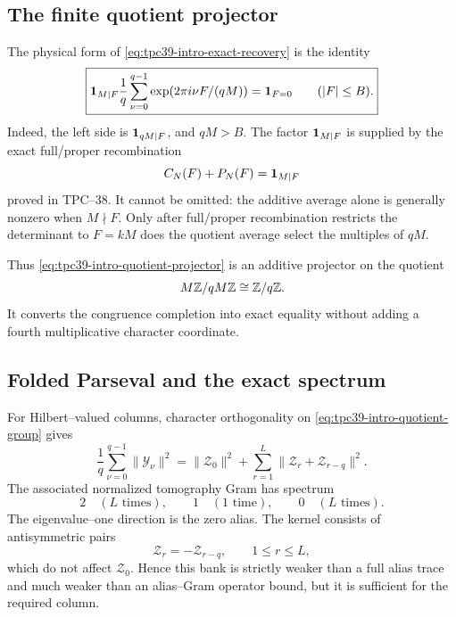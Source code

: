 \subsection{The finite quotient projector}

The physical form of \eqref{eq:tpc39-intro-exact-recovery} is the identity
\begin{equation}
 \boxed{
 \mathbf 1_{M\mid F}\frac1q\sum_{\nu=0}^{q-1}
 \exp(2\pi i \nu F/(qM))
 =\mathbf 1_{F=0}
 \qquad(|F|\le B).}
 \label{eq:tpc39-intro-quotient-projector}
\end{equation}
Indeed, the left side is \(\mathbf 1_{qM\mid F}\), and
\(qM>B\).  The factor \(\mathbf 1_{M\mid F}\) is supplied by the exact
full/proper recombination
\begin{equation}
 C_N(F)+P_N(F)=\mathbf 1_{M\mid F}
 \label{eq:tpc39-intro-face-recombination}
\end{equation}
proved in TPC--38.  It cannot be omitted: the additive average alone
is generally nonzero when \(M\nmid F\).  Only after full/proper
recombination restricts the determinant to \(F=kM\) does the quotient
average select the multiples of \(qM\).

Thus \eqref{eq:tpc39-intro-quotient-projector} is an additive projector on
the quotient
\begin{equation}
 M\mathbb Z/qM\mathbb Z\cong\mathbb Z/q\mathbb Z.
 \label{eq:tpc39-intro-quotient-group}
\end{equation}
It converts the congruence completion into exact equality without adding
a fourth multiplicative character coordinate.

\subsection{Folded Parseval and the exact spectrum}

For Hilbert--valued columns, character orthogonality on
\eqref{eq:tpc39-intro-quotient-group} gives
\begin{equation}
 \boxed{
 \frac1q\sum_{\nu=0}^{q-1}\|\mathscr Y_\nu\|^2
 =\|\mathscr Z_0\|^2+
 \sum_{r=1}^{L}\|\mathscr Z_r+\mathscr Z_{r-q}\|^2.}
 \label{eq:tpc39-intro-folded-Parseval}
\end{equation}
The associated normalized tomography Gram has spectrum
\begin{equation}
 2\quad(L\text{ times}),
 \qquad
 1\quad(1\text{ time}),
 \qquad
 0\quad(L\text{ times}).
 \label{eq:tpc39-intro-spectrum}
\end{equation}
The eigenvalue--one direction is the zero alias.  The kernel consists of
antisymmetric pairs
\begin{equation}
 \mathscr Z_r=-\mathscr Z_{r-q},
 \qquad 1\le r\le L,
 \label{eq:tpc39-intro-kernel}
\end{equation}
which do not affect \(\mathscr Z_0\).  Hence this bank is strictly weaker
than a full alias trace and much weaker than an alias--Gram operator bound,
but it is sufficient for the required column.

